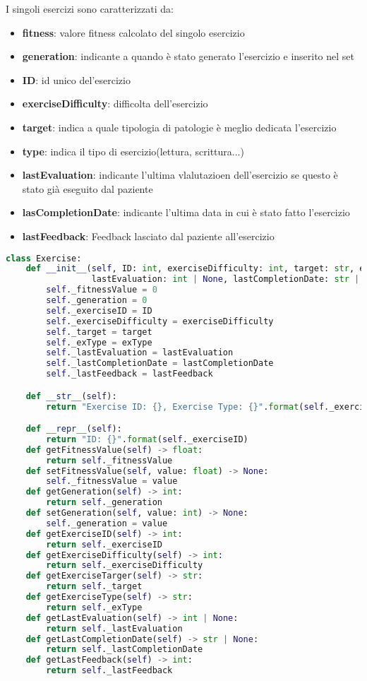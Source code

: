 \documentclass{article}
\begin{document}
I singoli esercizi sono caratterizzati da:
\begin{itemize}
\item\textbf{fitness}: valore fitness calcolato del singolo esercizio
\item\textbf{generation}: indicante a quando è stato generato l'esercizio e inserito nel set
\item\textbf{ID}: id unico del'esercizio
\item\textbf{exerciseDifficulty}: difficolta dell'esercizio
\item\textbf{target}: indica a quale tipologia di patologie è meglio dedicata l'esercizio
\item\textbf{type}: indica il tipo di esercizio(lettura, scrittura...)
\item\textbf{lastEvaluation}: indicante l'ultima vlalutazioen dell'esercizio se questo è stato già eseguito dal paziente
\item\textbf{lasCompletionDate}: indicante l'ultima data in cui è stato fatto l'esercizio
\item\textbf{lastFeedback}: Feedback lasciato dal paziente all'esercizio
\end{itemize}
\begin{lstlisting}[language=Python, breaklines, no caption]
    class Exercise:
    def __init__(self, ID: int, exerciseDifficulty: int, target: str, exType: str,
                 lastEvaluation: int | None, lastCompletionDate: str | None, lastFeedback: int | None):
        self._fitnessValue = 0
        self._generation = 0
        self._exerciseID = ID
        self._exerciseDifficulty = exerciseDifficulty
        self._target = target
        self._exType = exType
        self._lastEvaluation = lastEvaluation
        self._lastCompletionDate = lastCompletionDate
        self._lastFeedback = lastFeedback

    def __str__(self):
        return "Exercise ID: {}, Exercise Type: {}".format(self._exerciseID, self._exType)

    def __repr__(self):
        return "ID: {}".format(self._exerciseID)
    def getFitnessValue(self) -> float:
        return self._fitnessValue
    def setFitnessValue(self, value: float) -> None:
        self._fitnessValue = value
    def getGeneration(self) -> int:
        return self._generation
    def setGeneration(self, value: int) -> None:
        self._generation = value
    def getExerciseID(self) -> int:
        return self._exerciseID
    def getExerciseDifficulty(self) -> int:
        return self._exerciseDifficulty
    def getExerciseTarger(self) -> str:
        return self._target
    def getExerciseType(self) -> str:
        return self._exType
    def getLastEvaluation(self) -> int | None:
        return self._lastEvaluation
    def getLastCompletionDate(self) -> str | None:
        return self._lastCompletionDate
    def getLastFeedback(self) -> int:
        return self._lastFeedback
\end{lstlisting}
\end{document}
